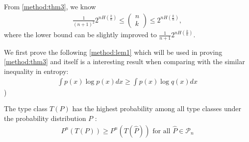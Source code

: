 \documentclass{article}
\newcommand{\typss}{\mathcal{P}_n}
\begin{document}
\begin{rema}{}\label{method:rem3}
From \cref{method:thm3}, we know 
\begin{align*}
\frac{1}{(n+1)^2} 2^{n H\left(\frac{k}{n}\right)} \leq\left(\begin{array}{l}
n \\
k
\end{array}\right) \leq 2^{n H\left(\frac{k}{n}\right)},
\end{align*}
where the lower bound can be slightly improved to $\frac{1}{n+1} 2^{n H\left(\frac{k}{n}\right)}$.
\end{rema}

We first prove the following \cref{method:lem1} which will be used in proving \cref{method:thm3} and itself is a interesting result when comparing with the similar inequality in entropy:
\begin{align*}
\int p(x) \log p (x) d x \geq \int p(x) \log q(x) d x
\end{align*}
)

\begin{lema}{}\label{method:lem1}
The type class $T(P)$ has the highest probability among all type classes under the probability distribution $P$ :
\begin{align*}
P^{n}(T(P)) \geq P^{n}(T(\hat{P})) \text { for all } \hat{P} \in \typss
\end{align*}
\end{lema}
\end{document}

